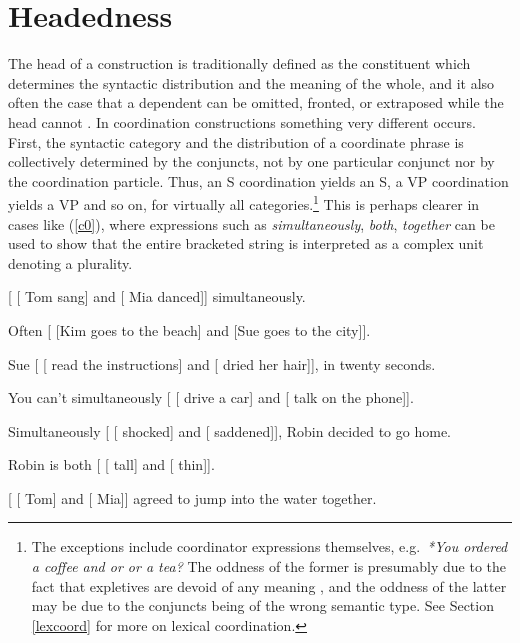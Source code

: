 \documentclass[output=paper
                ,modfonts
                ,nonflat
	        ,collection
	        ,collectionchapter
	        ,collectiontoclongg
 	        ,biblatex
                ,babelshorthands
                ,newtxmath
                ,draftmode
                ,colorlinks, citecolor=brown
]{./langsci/langscibook}
\begin{document}
\section{Headedness}

The head of a construction is traditionally defined as the constituent which determines the syntactic distribution and the meaning of the whole, and it also often the case that a dependent can be omitted, fronted, or extraposed while the head cannot \citep{zwicky85}. In coordination constructions something very different occurs. First, the syntactic category and the distribution of a coordinate phrase is collectively determined by the conjuncts, not by one particular conjunct nor by the coordination particle. Thus, an S coordination yields an S, a VP coordination yields a VP and so on, for virtually all categories.\footnote{The exceptions include coordinator expressions themselves, e.g.\ \emph{*You ordered a coffee and or or a tea?} The oddness of the former is presumably due to the fact that expletives are devoid of any meaning
\citep{MuellerGT-Eng0}, and the oddness of the latter may be due to the conjuncts being of the wrong semantic type. See Section \ref{lexcoord} for more on lexical coordination.}
This is perhaps clearer in cases like (\ref{c0}), where
expressions such as \emph{simultaneously}, \emph{both}, 
\emph{together} can be used to show that the entire bracketed string
is interpreted as a complex unit denoting a plurality.


\begin{exe}
\ex
\begin{xlista}
\ex{} [ [ Tom sang] and [ Mia danced]] simultaneously.

\ex{} Often [ [Kim goes to the beach] and [Sue goes to the city]].

\ex{} Sue [ [ read the instructions] and [ dried her hair]], in twenty seconds.

\ex{} You can't simultaneously [ [ drive a car] and [ talk on the phone]].

\ex{} Simultaneously [ [ shocked] and [ saddened]], Robin decided to go home.

\ex Robin is both [ [ tall] and [ thin]].

\ex{} [ [ Tom] and [ Mia]] agreed to jump into the water together.

\end{xlista}\label{c0}
\end{exe}
\end{document}
